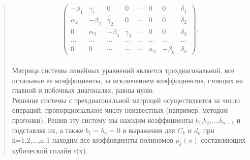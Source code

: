 \documentclass{article}
\begin{document}
\begin{quotation}
	
$$\begin{pmatrix}-\beta_1& \gamma_1&0&0&\cdots&0&0&\delta_1\\[2pt] \alpha_2&-\beta_2&\gamma_2&0&\cdots&0&0&\delta_2\\[2pt] 0&\alpha_3&-\beta_3&\gamma_3&\cdots& 0&0&\delta_3\\[2pt] \cdots& \cdots& \cdots& \cdots& \cdots& \cdots& \cdots& \cdots\\[2pt] 0&0& \cdots&\cdots&\cdots&\alpha_n&-\beta_n&\delta_n \end{pmatrix}\!.$$\\



	Матрица системы линейных уравнений является трехдиагональной, все остальные ее коэффициенты, за исключением коэффициентов, стоящих на главной и побочных диагоналях, равны нулю.\\
 	Решение системы с трехдиагональной матрицей осуществляется за число операций, пропорциональное числу неизвестных (например, методом прогонки). Решив эту систему мы находим коэффициенты $b_1$,$b_2$,...,$b_{n-1}$ и подставляя их, а также $b_1=b_n=0$ в выражения для $C_k$ и $d_k$ при к=1,2,...,n-1 находим все коэффициенты полиномов $p_k(x)$ составляющих кубический сплайн s(x).\\

\end{quotation}
\end{document}
